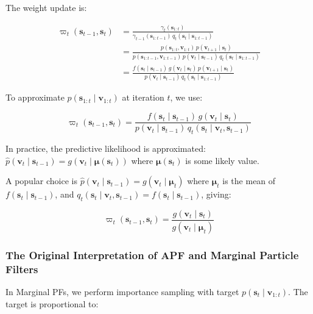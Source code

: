 \documentclass[11pt,a4paper]{article}
\begin{document}
The weight update is:

\begin{align}
\varpi_t(\mathbf{s}_{t-1}, \mathbf{s}_t) &= \frac{\gamma_t(\mathbf{s}_{1:t})}{\gamma_{t-1}(\mathbf{s}_{1:t-1}) \, q_t(\mathbf{s}_t \mid \mathbf{s}_{1:t-1})} \nonumber \\
&= \frac{p(\mathbf{s}_{1:t}, \mathbf{v}_{1:t}) \, p(\mathbf{v}_{t+1} \mid \mathbf{s}_t)}{p(\mathbf{s}_{1:t-1}, \mathbf{v}_{1:t-1}) \, p(\mathbf{v}_t \mid \mathbf{s}_{t-1}) \, q_t(\mathbf{s}_t \mid \mathbf{s}_{1:t-1})} \nonumber \\
&= \frac{f(\mathbf{s}_t \mid \mathbf{s}_{t-1}) \, g(\mathbf{v}_t \mid \mathbf{s}_t) \, p(\mathbf{v}_{t+1} \mid \mathbf{s}_t)}{p(\mathbf{v}_t \mid \mathbf{s}_{t-1}) \, q_t(\mathbf{s}_t \mid \mathbf{s}_{1:t-1})}
\label{eq:apf_weight_update}
\end{align}

To approximate $p(\mathbf{s}_{1:t} \mid \mathbf{v}_{1:t})$ at iteration $t$, we use:

\begin{equation}
\varpi_t(\mathbf{s}_{t-1}, \mathbf{s}_t) = \frac{f(\mathbf{s}_t \mid \mathbf{s}_{t-1}) \, g(\mathbf{v}_t \mid \mathbf{s}_t)}{p(\mathbf{v}_t \mid \mathbf{s}_{t-1}) \, q_t(\mathbf{s}_t \mid \mathbf{v}_t, \mathbf{s}_{t-1})}
\end{equation}

In practice, the predictive likelihood is approximated: $\widehat{p}(\mathbf{v}_t \mid \mathbf{s}_{t-1}) = g(\mathbf{v}_t \mid \boldsymbol{\mu}(\mathbf{s}_t))$ where $\boldsymbol{\mu}(\mathbf{s}_t)$ is some likely value.

A popular choice is $\widehat{p}(\mathbf{v}_t \mid \mathbf{s}_{t-1}) = g(\mathbf{v}_t \mid \boldsymbol{\mu}_t)$ where $\boldsymbol{\mu}_t$ is the mean of $f(\mathbf{s}_t \mid \mathbf{s}_{t-1})$, and $q_t(\mathbf{s}_t \mid \mathbf{v}_t, \mathbf{s}_{t-1}) = f(\mathbf{s}_t \mid \mathbf{s}_{t-1})$, giving:

\begin{equation}
\varpi_t(\mathbf{s}_{t-1}, \mathbf{s}_t) = \frac{g(\mathbf{v}_t \mid \mathbf{s}_t)}{g(\mathbf{v}_t \mid \boldsymbol{\mu}_t)}
\end{equation}

\subsubsection{The Original Interpretation of APF and Marginal Particle Filters}

In Marginal PFs, we perform importance sampling with target $p(\mathbf{s}_t \mid \mathbf{v}_{1:t})$. The target is proportional to:
\end{document}
